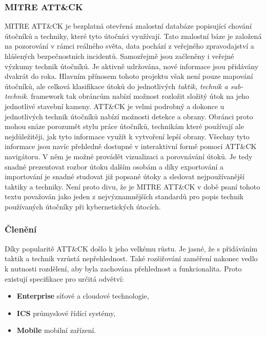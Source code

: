 \subsubsection{MITRE ATT\&CK}
MITRE ATT\&CK je bezplatná otevřená znalostní databáze popisující chování útočníků a techniky, které tyto útočníci využívají.
Tato znalostní báze je založená na pozorování v rámci reálného světa, data pochází z veřejného zpravodajství a hlášených bezpečnostních incidentů.
Samozřejmě jsou začleněny i veřejné výzkumy technik útočníků.
Je aktivně udržována, nové informace jsou přidávány dvakrát do roka\cite{mitre_attack_framework_faq}.
Hlavním přínosem tohoto projektu však není pouze mapování útočníků, ale celková klasifikace útoků do jednotlivých \textit{taktik, technik a sub-technik}.
framework tak obráncům nabízí možnost rozložit složitý útok na jeho jednotlivé stavební kameny.
ATT\&CK je velmi podrobný a dokonce u jednotlivých technik útočníků nabízí možnosti detekce a obrany.
Obránci proto mohou snáze porozumět stylu práce útočníků, technikám které používají ale nejdůležitěji, jak tyto informace využít k vytvoření lepší obrany.
Všechny tyto informace jsou navíc přehledně dostupné v interaktivní formě pomocí ATT\&CK navigátoru\cite{mitre_attack_navigator}.
V něm je možné provádět vizualizaci a porovnávání útoků.
Je tedy snadné prezentovat rozbor útoku dalším osobám a díky exportování a importování je snadné studovat již popsané útoky a sledovat nejpoužívanější taktiky a techniky.
Není proto divu, že je MITRE ATT\&CK v době psaní tohoto textu považován jako jeden z nejvýznamnějších standardů pro popis technik používaných útočníky při kybernetických útocích.\cite{mitre_attack_framework}


\subsubsection{Členění}
Díky popularitě ATT\&CK došlo k jeho velkému růstu.
Je jasné, že s přidáváním taktik a technik vzrůstá nepřehlednost.
Také rozšiřování zaměření nakonec vedlo k nutnosti rozdělení, aby byla zachována přehlednost a funkcionalita.
Proto existují specifikace pro určitá odvětví:

\begin{itemize}
	\item \textbf{Enterprise} \- síťové a cloudové technologie,
	\item \textbf{ICS} \- průmyslové řídící systémy,
	\item \textbf{Mobile} \- mobilní zařízení.
\end{itemize}

